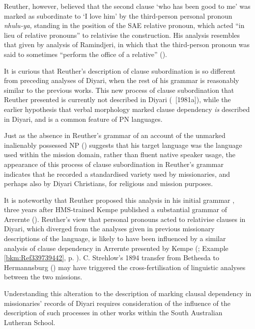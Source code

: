 Reuther, however, believed that the second clause `who has been good to me' was marked as subordinate to `I love him' by the third-person personal pronoun \textit{nhulu-ya,} standing in the position of the SAE relative pronoun, which acted “in lieu of relative pronouns” to relativise the construction. His analysis resembles that given by  analysis of Ramindjeri, in which that the third-person pronoun was said to sometimes “perform the office of a relative” ().

It is curious that Reuther’s description of clause subordination is so different from preceding analyses of Diyari, when the rest of his grammar is reasonably similar to the previous works. This new process of clause subordination that Reuther presented is currently not described in Diyari (\citealt{austin_grammar_2013}~[1981a]), while the earlier hypothesis that verbal morphology marked clause dependency \textit{is} described in Diyari, and is a common feature of PN languages.

Just as the absence in Reuther’s grammar of an account of the unmarked inalienably possessed NP () suggests that his target language was the language used within the mission domain, rather than fluent native speaker usage, the appearance of this process of clause subordination in Reuther’s grammar indicates that he recorded a standardised variety used by missionaries, and perhaps also by Diyari Christians, for religious and mission purposes.

It is noteworthy that Reuther proposed this analysis in his initial grammar \citeyearpar{reuther_dieri_1894}, three years after HMS-trained Kempe published a substantial grammar of Arrernte (). Reuther’s view that personal pronouns acted to relativise clauses in Diyari, which diverged from the analyses given in previous missionary descriptions of the language, is likely to have been influenced by a similar analysis of clause dependency in Arrernte presented by Kempe (; Example \ref{bkm:Ref339739442}, p. \pageref{bkm:Ref339739442}). C. Strehlow’s 1894 transfer from Bethesda to Hermannsburg () may have triggered the cross-fertilisation of linguistic analyses between the two missions.

Understanding this alteration to the description of marking clausal dependency in missionaries' records of Diyari requires consideration of the influence of the description of such processes in other works within the South Australian Lutheran School.

